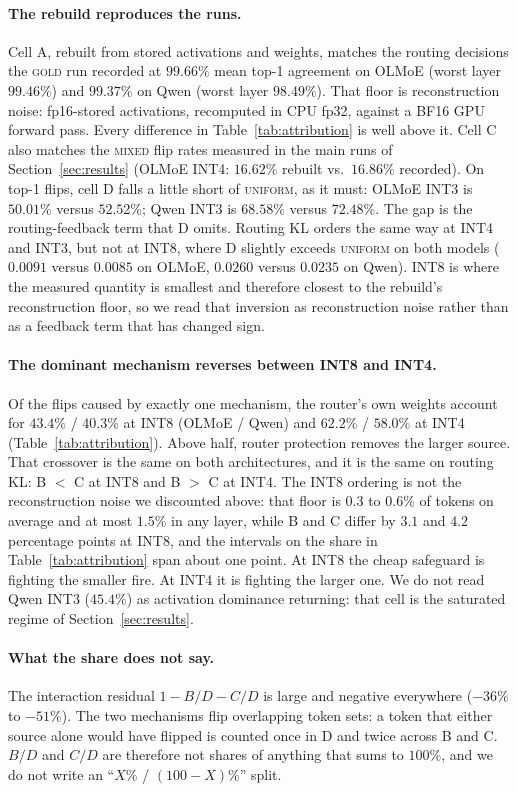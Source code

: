 \documentclass[11pt]{article}
\newcommand{\gold}{\textsc{gold}}
\newcommand{\uniform}{\textsc{uniform}}
\newcommand{\mixed}{\textsc{mixed}}
\begin{document}
\paragraph{The rebuild reproduces the runs.}
Cell A, rebuilt from stored activations and weights, matches the routing
decisions the \gold{} run recorded at $99.66\%$ mean top-1 agreement on
OLMoE (worst layer $99.46\%$) and $99.37\%$ on Qwen (worst layer
$98.49\%$). That floor is reconstruction noise: fp16-stored activations,
recomputed in CPU fp32, against a BF16 GPU forward pass. Every difference
in Table~\ref{tab:attribution} is well above it. Cell C also matches the
\mixed{} flip rates measured in the main runs of
Section~\ref{sec:results} (OLMoE INT4: $16.62\%$ rebuilt vs.\
$16.86\%$ recorded). On top-1 flips, cell D falls a little short of
\uniform{}, as it must: OLMoE INT3 is $50.01\%$ versus $52.52\%$; Qwen INT3
is $68.58\%$ versus $72.48\%$. The gap is the routing-feedback term that D
omits. Routing KL orders the same way at INT4 and INT3, but not at INT8,
where D slightly exceeds \uniform{} on both models ($0.0091$ versus
$0.0085$ on OLMoE, $0.0260$ versus $0.0235$ on Qwen). INT8 is where the
measured quantity is smallest and therefore closest to the rebuild's
reconstruction floor, so we read that inversion as reconstruction noise
rather than as a feedback term that has changed sign.

\paragraph{The dominant mechanism reverses between INT8 and INT4.}
Of the flips caused by exactly one mechanism, the router's own weights
account for $43.4\%$ / $40.3\%$ at INT8 (OLMoE / Qwen) and $62.2\%$ /
$58.0\%$ at INT4 (Table~\ref{tab:attribution}). Above half, router
protection removes the larger source. That crossover is the same on both
architectures, and it is the same on routing KL: B $<$ C at INT8 and
B $>$ C at INT4. The INT8 ordering is not the reconstruction noise we
discounted above: that floor is $0.3$ to $0.6\%$ of tokens on average
and at most $1.5\%$ in any layer, while B and C differ by $3.1$ and
$4.2$ percentage points at INT8, and the intervals on the share in
Table~\ref{tab:attribution} span about one point. At INT8 the cheap
safeguard is fighting
the smaller fire. At INT4 it is fighting the larger one. We do not read
Qwen INT3 ($45.4\%$) as activation dominance returning: that cell is the
saturated regime of Section~\ref{sec:results}.

\paragraph{What the share does not say.}
The interaction residual $1-B/D-C/D$ is large and negative everywhere
($-36\%$ to $-51\%$). The two mechanisms flip overlapping token sets: a
token that either source alone would have flipped is counted once in D
and twice across B and C. $B/D$ and $C/D$ are therefore not shares of
anything that sums to $100\%$, and we do not write an
``$X\%$ / $(100{-}X)\%$'' split.
\end{document}
